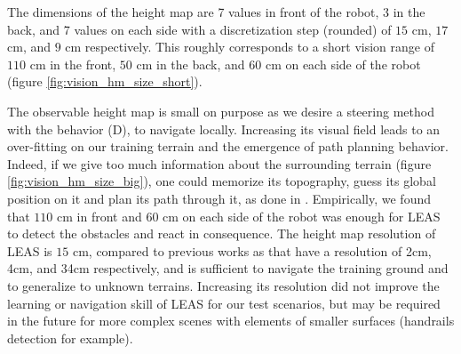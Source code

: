 The dimensions of the height map are 7 values in front of the robot, 3 in the back, and 7 values on each side with a discretization step (rounded) of $15$ cm, $17$ cm, and $9$ cm respectively. This roughly corresponds to a short vision range of $110$ cm in the front, $50$ cm in the back, and $60$ cm on each side of the robot (figure \ref{fig:vision_hm_size_short}).

The observable height map is small on purpose as we desire a steering method with the behavior (D), to navigate locally. Increasing its visual field leads to an over-fitting on our training terrain and the emergence of path planning behavior.
Indeed, if we give too much information about the surrounding terrain (figure \ref{fig:vision_hm_size_big}), one could memorize its topography, guess its global position on it and plan its path through it, as done in \cite{rl_navigation_video_game_2020}.
Empirically, we found that $110$ cm in front and $60$ cm on each side of the robot was enough for LEAS to detect the obstacles and react in consequence.
The height map resolution of LEAS is $15$ cm, compared to previous works as \cite{RLOC, deepGait, deepLoco} that have a resolution of 2cm, 4cm, and 34cm respectively, and is sufficient to navigate the training ground and to generalize to unknown terrains. 
Increasing its resolution did not improve the learning or navigation skill of LEAS for our test scenarios, but may be required in the future for more complex scenes with elements of smaller surfaces (handrails detection for example).

